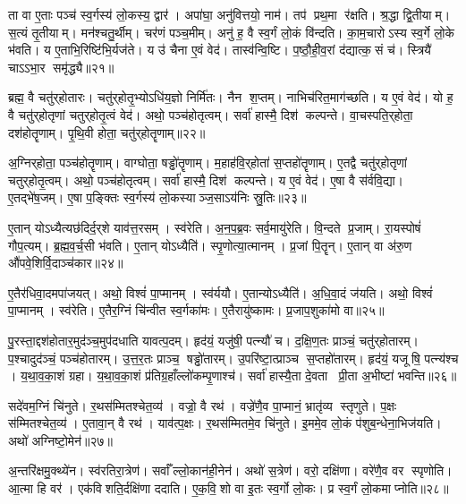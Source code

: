    ता वा ए॒ताः पञ्च॑ स्व॒र्गस्य॑ लो॒कस्य॒ द्वार॑।
   अपा॑घा॒ अनु॑वित्तयो॒ नाम॑।
   तप॑ प्रथ॒मा र॑क्षति।
   श्र॒द्धा द्वि॒तीयाम्।
   स॒त्यं तृ॒तीयाम्।
   मन॑श्चतु॒र्थीम्।
   चर॑णं पञ्च॒मीम्।
   अनु॑ ह॒ वै स्व॒र्गं लो॒कं वि॑न्दति।
   का॒म॒चारोऽस्य स्व॒र्गे लो॒के भ॑वति।
   य ए॒ताभि॒रिष्टि॑भि॒र्यज॑ते।
   य उ॑ चैना ए॒वं वेद॑।
   तास्व॑न्वि॒ष्टि।
   प॒ष्ठौ॒ही॒व॒रां द॑द्यात्क॒सं च॑।
   स्त्रियै॑ चाऽऽभा॒र समृ॑द्ध्यै॥२१॥
\anuvakamend
  
   ब्रह्म॒ वै चतु॑र्‌होतारः।
   चतु॑र्‌होतृ॒भ्योऽधि॑य॒ज्ञो निर्मि॑तः।
   नैन श॒प्तम्।
   नाभिच॑रित॒माग॑च्छति।
   य ए॒वं वेद॑।
   यो ह॒ वै चतु॑र्‌होतृणां चतुर्‌होतृ॒त्वं वेद॑।
   अथो॒ पञ्च॑होतृत्वम्।
   सर्वा॑ हास्मै॒ दिश॑ कल्पन्ते।
   वा॒चस्पति॒र्‌होता॒ दश॑होतॄणाम्।
   पृ॒थि॒वी होता॒ चतु॑र्‌होतॄणाम्॥२२॥

   अ॒ग्निर्‌होता॒ पञ्च॑होतॄणाम्।
   वाग्घोता॒ षड्ढो॑तॄणाम्।
   म॒हाह॑वि॒र्‌होता॑ स॒प्तहो॑तॄणाम्।
   ए॒तद्वै चतु॑र्‌होतृणां चतुर्‌होतृ॒त्वम्।
   अथो॒ पञ्च॑होतृत्वम्।
   सर्वा॑ हास्मै॒ दिश॑ कल्पन्ते।
   य ए॒वं वेद॑।
   ए॒षा वै स॑र्ववि॒द्या।
   ए॒तद्भे॑ष॒जम्।
   ए॒षा प॒ङ्क्तिः स्व॒र्गस्य॑ लो॒कस्याञ्ज॒साऽय॑निः स्रु॒तिः॥२३॥

   ए॒तान् योऽध्यैत्यछ॑दिर्द॒र्‌शे याव॑त्त॒रसम्।
   स्व॑रेति।
   अ॒न॒प॒ब्र॒वः सर्व॒मायु॑रेति।
   वि॒न्दते प्र॒जाम्।
   रा॒यस्पोषं॑ गौप॒त्यम्।
   ब्र॒ह्म॒व॒र्च॒सी भ॑वति।
   ए॒तान् योऽध्यैति॑।
   स्पृ॒णोत्या॒त्मानम्।
   प्र॒जां पि॒तॄन्।
   ए॒तान् वा अ॑रु॒ण औ॑पवे॒शिर्वि॒दाञ्च॑कार॥२४॥

   ए॒तैर॑धिवा॒दमपा॑जयत्।
   अथो॒ विश्वं॑ पा॒प्मानम्।
   स्व॑र्ययौ।
   ए॒तान्योऽध्यैति॑।
   अ॒धि॒वा॒दं ज॑यति।
   अथो॒ विश्वं॑ पा॒प्मानम्।
   स्व॑रेति।
   ए॒तैर॒ग्निं चि॑न्वीत स्व॒र्गका॑मः।
   ए॒तैरायु॑ष्कामः।
   प्र॒जाप॒शुका॑मो वा॥२५॥

   पु॒रस्ता॒द्दश॑होतार॒मुद॑ञ्च॒मुप॑दधाति यावत्प॒दम्।
   हृद॑यं॒ यजु॑षी॒ पत्न्यौ॑ च।
   द॒क्षि॒ण॒तः प्राञ्चं॒ चतु॑र्‌होतारम्।
   प॒श्चादुद॑ञ्चं॒ पञ्च॑होतारम्।
   उ॒त्त॒र॒तः प्राञ्च॒ षड्ढो॑तारम्।
   उ॒परि॑ष्टा॒त्प्राञ्च स॒प्तहो॑तारम्।
   हृद॑यं॒ यजूषि॒ पत्न्य॑श्च ।
   य॒था॒व॒का॒शं ग्रहा\sn{}।
   य॒था॒व॒का॒शं प्र॑तिग्र॒हाँल्लो॑कम्पृ॒णाश्च॑।
   सर्वा॑ हास्यै॒ता दे॒वता प्री॒ता अ॒भीष्टा॑ भवन्ति॥२६॥

   सदे॑वम॒ग्निं चि॑नुते।
   र॒थस॑म्मितश्चेत॒व्य॑।
   वज्रो॒ वै रथ॑।
   वज्रे॑णै॒व पा॒प्मानं॒ भ्रातृ॑व्य स्तृणुते।
   प॒क्षः स॑म्मितश्चेत॒व्य॑।
   ए॒तावा॒न् वै रथ॑।
   याव॑त्प॒क्षः।
   र॒थस॑म्मितमे॒व चि॑नुते।
   इ॒ममे॒व लो॒कं प॑शुब॒न्धेना॒भिज॑यति।
   अथो॑ अग्निष्टो॒मेन॑॥२७॥

   अ॒न्तरि॑क्षमु॒क्थ्ये॑न।
   स्व॑रतिरा॒त्रेण॑।
   सर्वाँल्लो॒कान॑ही॒नेन॑।
   अथो॑ स॒त्रेण॑।
   वरो॒ दक्षि॑णा।
   वरे॑णै॒व वर स्पृणोति।
   आ॒त्मा हि वर॑।
   एक॑विशति॒र्दक्षि॑णा ददाति।
   ए॒क॒वि॒शो वा इ॒तः स्व॒र्गो लो॒कः।
   प्र स्व॒र्गं लो॒कमाप्नोति॥२८॥

